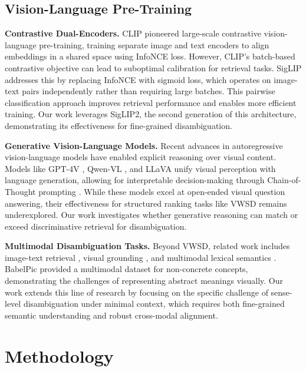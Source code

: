 \documentclass[11pt]{article}
\begin{document}
\subsection{Vision-Language Pre-Training}

\textbf{Contrastive Dual-Encoders.} CLIP \cite{radford2021clip} pioneered large-scale contrastive vision-language pre-training, training separate image and text encoders to align embeddings in a shared space using InfoNCE loss. However, CLIP's batch-based contrastive objective can lead to suboptimal calibration for retrieval tasks. SigLIP \cite{zhai2023siglip} addresses this by replacing InfoNCE with sigmoid loss, which operates on image-text pairs independently rather than requiring large batches. This pairwise classification approach improves retrieval performance and enables more efficient training. Our work leverages SigLIP2, the second generation of this architecture, demonstrating its effectiveness for fine-grained disambiguation.

\textbf{Generative Vision-Language Models.} Recent advances in autoregressive vision-language models have enabled explicit reasoning over visual content. Models like GPT-4V \cite{openai2023gpt4v}, Qwen-VL \cite{bai2023qwen}, and LLaVA \cite{liu2023llava} unify visual perception with language generation, allowing for interpretable decision-making through Chain-of-Thought prompting \cite{wei2022chain}. While these models excel at open-ended visual question answering, their effectiveness for structured ranking tasks like VWSD remains underexplored. Our work investigates whether generative reasoning can match or exceed discriminative retrieval for disambiguation.

\textbf{Multimodal Disambiguation Tasks.} Beyond VWSD, related work includes image-text retrieval \cite{li2020oscar}, visual grounding \cite{kazemzadeh2014referit}, and multimodal lexical semantics \cite{calabrese2020evilbert}. BabelPic \cite{calabrese2020babelpic} provided a multimodal dataset for non-concrete concepts, demonstrating the challenges of representing abstract meanings visually. Our work extends this line of research by focusing on the specific challenge of sense-level disambiguation under minimal context, which requires both fine-grained semantic understanding and robust cross-modal alignment.

\section{Methodology}
\label{sec:method}
\end{document}

